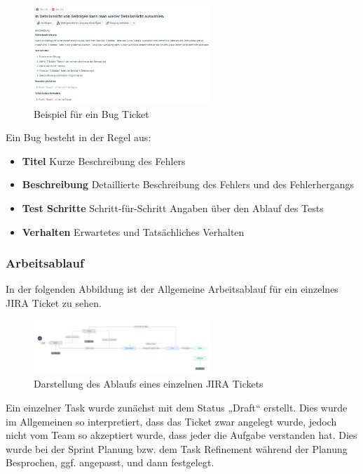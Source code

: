 \begin{figure}[ht!]
    \centering
    \includegraphics[width=0.6\textwidth]{figures/andre/bugticket.jpg}
    \caption{Beispiel für ein Bug Ticket}
    \label{fig:bugticket}
\end{figure}

Ein Bug besteht in der Regel aus:

\begin{itemize}
    \item \textbf{Titel} Kurze Beschreibung des Fehlers
    \item \textbf{Beschreibung} Detaillierte Beschreibung des Fehlers und des Fehlerhergangs
    \item \textbf{Test Schritte} Schritt-für-Schritt Angaben über den Ablauf des Tests
    \item \textbf{Verhalten} Erwartetes und Tatsächliches Verhalten
\end{itemize}

\subsubsection{Arbeitsablauf}
In der folgenden Abbildung ist der Allgemeine Arbeitsablauf für ein einzelnes JIRA Ticket zu sehen.

\begin{figure}[h!]
    \centering
    \includegraphics[width=0.6\textwidth]{figures/andre/workflow.jpg}
    \caption{Darstellung des Ablaufs eines einzelnen JIRA Tickets}
    \label{fig:workflow}
\end{figure}

Ein einzelner Task wurde zunächst mit dem Status „Draft“ erstellt. Dies wurde im Allgemeinen so interpretiert, dass das Ticket zwar angelegt wurde, jedoch nicht vom Team so akzeptiert wurde, dass jeder die Aufgabe verstanden hat. Dies wurde bei der Sprint Planung bzw. dem Task Refinement während der Planung Besprochen, ggf. angepasst, und dann festgelegt. 

